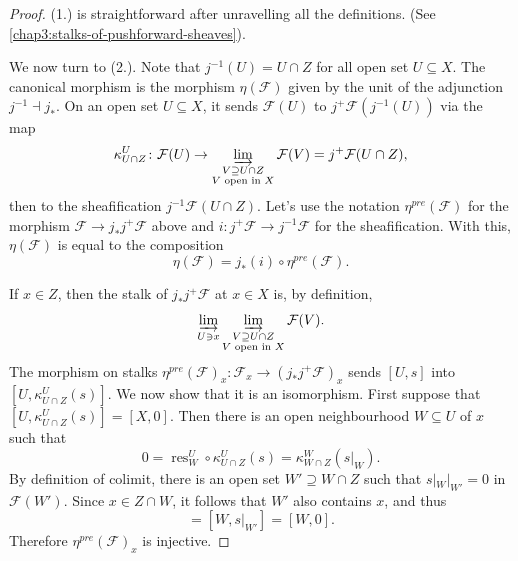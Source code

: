 \documentclass[12pt]{book}
\theoremstyle{definition}
\newcommand{\res}{\operatorname{res}}
\begin{document}
	\begin{proof}
		(1.) is straightforward after unravelling all the definitions. (See \cref{chap3:stalks-of-pushforward-sheaves}).
		
		We now turn to (2.). Note that $j^{-1}(U) = U \cap Z$ for all open set $U \subseteq X$. The canonical morphism is the morphism $\eta(\mathcal{F})$ given by the unit of the adjunction $j^{-1} \dashv j_\ast$. On an open set $U \subseteq X$, it sends $\mathcal{F}(U)$ to $j^+\mathcal{F}(j^{-1}(U))$ via the map
		\begin{equation*}
			\kappa^U_{U \cap Z} \colon \mathcal{F}(U) \to \varinjlim_{\substack{V \supseteq U \cap Z \\ V \text{ open in $X$}}} \mathcal{F}(V) = j^+\mathcal{F}(U \cap Z),
		\end{equation*} 
		then to the sheafification $j^{-1}\mathcal{F}(U \cap Z)$. Let's use the notation $\eta^{pre}(\mathcal{F})$ for the morphism $\mathcal{F} \to j_\ast j^+\mathcal{F}$ above and $i \colon j^{+}\mathcal{F} \to j^{-1}\mathcal{F}$ for the sheafification. With this, $\eta(\mathcal{F})$ is equal to the composition
		\begin{equation*}
			\eta(\mathcal{F}) = j_\ast(i)\circ \eta^{pre}(\mathcal{F}).
		\end{equation*}
	
		If $x \in Z$, then the stalk of $j_\ast j^{+} \mathcal{F}$ at $x \in X$ is, by definition,
		\begin{equation*}
			\varinjlim_{U \ni x} \varinjlim_{\substack{V \supseteq U \cap Z \\ V \text{ open in $X$}}} \mathcal{F}(V).
		\end{equation*}
		The morphism on stalks $\eta^{pre}(\mathcal{F})_x \colon \mathcal{F}_x \to (j_\ast j^{+} \mathcal{F})_x$ sends $[U, s]$ into $[U, \kappa^U_{U \cap Z}(s)]$. We now show that it is an isomorphism. First suppose that $[U, \kappa^U_{U \cap Z}(s)] = [X, 0]$. Then there is an open neighbourhood $W \subseteq U$ of $x$ such that
		\begin{equation*}
			0 = \res^U_W \circ \kappa^U_{U \cap Z}(s) = \kappa^W_{W \cap Z}(s|_W).
		\end{equation*}
		By definition of colimit, there is an open set $W' \supseteq W \cap Z$ such that $s|_W|_{W'} = 0$ in $\mathcal{F}(W')$. Since $x \in Z \cap W$, it follows that $W'$ also contains $x$, and thus 
		\begin{equation*}
			[U, s] = [W, s|_{W'}] = [W, 0].
		\end{equation*}
		Therefore $\eta^{pre}(\mathcal{F})_x$ is injective.
		

\end{proof}
\end{document}
